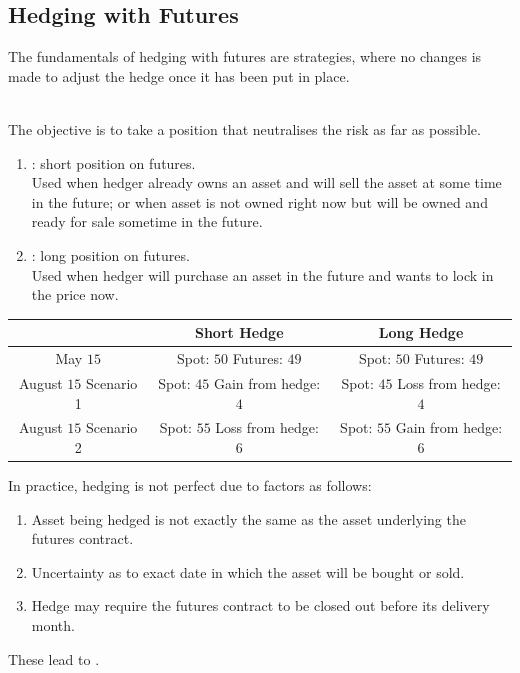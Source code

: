 \subsection{Hedging with Futures}

The fundamentals of hedging with futures are  strategies, where no changes is made to adjust the hedge once it has been put in place.

\begin{definition}
\\
The objective is to take a position that neutralises the risk as far as possible.
\begin{enumerate}[label=\roman*.]
\setlength{\itemsep}{0pt}
\item {}: short position on futures. \\
Used when hedger already owns an asset and will sell the asset at some time in the future; or when asset is not owned right now but will be owned and ready for sale sometime in the future.
\item {}: long position on futures. \\
Used when hedger will purchase an asset in the future and wants to lock in the price now.
\end{enumerate}
\begin{table}[H]
\begin{tabular}{|c | c | c|}
\hline
 & \textbf{Short Hedge} & \textbf{Long Hedge} \\ \hline
May $15$ & \makecell[l]{Spot: $50$ \\ Futures: $49$} & \makecell[l]{Spot: $50$ \\ Futures: $49$} \\ \hline
August $15$ Scenario 1 & \makecell[l]{Spot: $45$ \\ Gain from hedge: $4$} &  \makecell[l]{Spot: $45$ \\ Loss from hedge: $4$} \\ \hline
August $15$ Scenario 2 & \makecell[l]{Spot: $55$ \\ Loss from hedge: $6$} & \makecell[l]{Spot: $55$ \\ Gain from hedge: $6$} \\ \hline
\end{tabular}
\end{table}
\end{definition}

In practice, hedging is not perfect due to factors as follows:
\begin{enumerate}[label=\arabic*.]
\setlength{\itemsep}{0pt}
\item Asset being hedged is not exactly the same as the asset underlying the futures contract.
\item Uncertainty as to exact date in which the asset will be bought or sold.
\item Hedge may require the futures contract to be closed out before its delivery month.
\end{enumerate}
These lead to .

